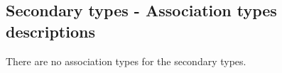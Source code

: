 \subsection{Secondary types - Association types descriptions}



There are no association types for the secondary types.


